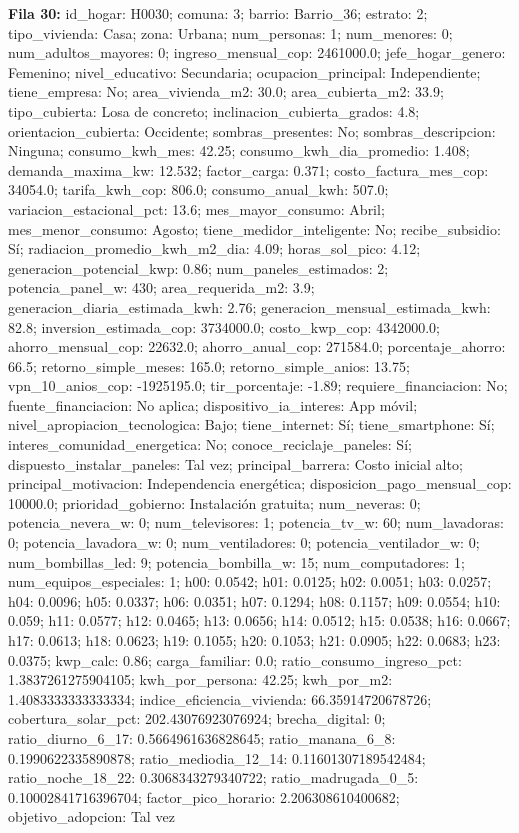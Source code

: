 {\footnotesize\textbf{Fila 30:} id\_hogar: H0030; comuna: 3; barrio: Barrio\_36; estrato: 2; tipo\_vivienda: Casa; zona: Urbana; num\_personas: 1; num\_menores: 0; num\_adultos\_mayores: 0; ingreso\_mensual\_cop: 2461000.0; jefe\_hogar\_genero: Femenino; nivel\_educativo: Secundaria; ocupacion\_principal: Independiente; tiene\_empresa: No; area\_vivienda\_m2: 30.0; area\_cubierta\_m2: 33.9; tipo\_cubierta: Losa de concreto; inclinacion\_cubierta\_grados: 4.8; orientacion\_cubierta: Occidente; sombras\_presentes: No; sombras\_descripcion: Ninguna; consumo\_kwh\_mes: 42.25; consumo\_kwh\_dia\_promedio: 1.408; demanda\_maxima\_kw: 12.532; factor\_carga: 0.371; costo\_factura\_mes\_cop: 34054.0; tarifa\_kwh\_cop: 806.0; consumo\_anual\_kwh: 507.0; variacion\_estacional\_pct: 13.6; mes\_mayor\_consumo: Abril; mes\_menor\_consumo: Agosto; tiene\_medidor\_inteligente: No; recibe\_subsidio: Sí; radiacion\_promedio\_kwh\_m2\_dia: 4.09; horas\_sol\_pico: 4.12; generacion\_potencial\_kwp: 0.86; num\_paneles\_estimados: 2; potencia\_panel\_w: 430; area\_requerida\_m2: 3.9; generacion\_diaria\_estimada\_kwh: 2.76; generacion\_mensual\_estimada\_kwh: 82.8; inversion\_estimada\_cop: 3734000.0; costo\_kwp\_cop: 4342000.0; ahorro\_mensual\_cop: 22632.0; ahorro\_anual\_cop: 271584.0; porcentaje\_ahorro: 66.5; retorno\_simple\_meses: 165.0; retorno\_simple\_anios: 13.75; vpn\_10\_anios\_cop: -1925195.0; tir\_porcentaje: -1.89; requiere\_financiacion: No; fuente\_financiacion: No aplica; dispositivo\_ia\_interes: App móvil; nivel\_apropiacion\_tecnologica: Bajo; tiene\_internet: Sí; tiene\_smartphone: Sí; interes\_comunidad\_energetica: No; conoce\_reciclaje\_paneles: Sí; dispuesto\_instalar\_paneles: Tal vez; principal\_barrera: Costo inicial alto; principal\_motivacion: Independencia energética; disposicion\_pago\_mensual\_cop: 10000.0; prioridad\_gobierno: Instalación gratuita; num\_neveras: 0; potencia\_nevera\_w: 0; num\_televisores: 1; potencia\_tv\_w: 60; num\_lavadoras: 0; potencia\_lavadora\_w: 0; num\_ventiladores: 0; potencia\_ventilador\_w: 0; num\_bombillas\_led: 9; potencia\_bombilla\_w: 15; num\_computadores: 1; num\_equipos\_especiales: 1; h00: 0.0542; h01: 0.0125; h02: 0.0051; h03: 0.0257; h04: 0.0096; h05: 0.0337; h06: 0.0351; h07: 0.1294; h08: 0.1157; h09: 0.0554; h10: 0.059; h11: 0.0577; h12: 0.0465; h13: 0.0656; h14: 0.0512; h15: 0.0538; h16: 0.0667; h17: 0.0613; h18: 0.0623; h19: 0.1055; h20: 0.1053; h21: 0.0905; h22: 0.0683; h23: 0.0375; kwp\_calc: 0.86; carga\_familiar: 0.0; ratio\_consumo\_ingreso\_pct: 1.3837261275904105; kwh\_por\_persona: 42.25; kwh\_por\_m2: 1.4083333333333334; indice\_eficiencia\_vivienda: 66.35914720678726; cobertura\_solar\_pct: 202.43076923076924; brecha\_digital: 0; ratio\_diurno\_6\_17: 0.5664961636828645; ratio\_manana\_6\_8: 0.1990622335890878; ratio\_mediodia\_12\_14: 0.11601307189542484; ratio\_noche\_18\_22: 0.3068343279340722; ratio\_madrugada\_0\_5: 0.10002841716396704; factor\_pico\_horario: 2.206308610400682; objetivo\_adopcion: Tal vez\par}

